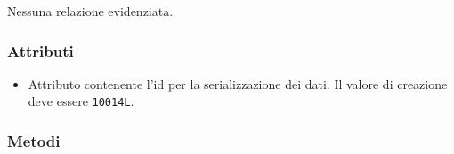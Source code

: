 Nessuna relazione evidenziata.

\subsubsection*{Attributi}

\begin{itemize}
	\item{}
	Attributo contenente l'id per la serializzazione dei dati. Il valore di creazione deve essere \texttt{10014L}.
\end{itemize}

\subsubsection*{Metodi}


